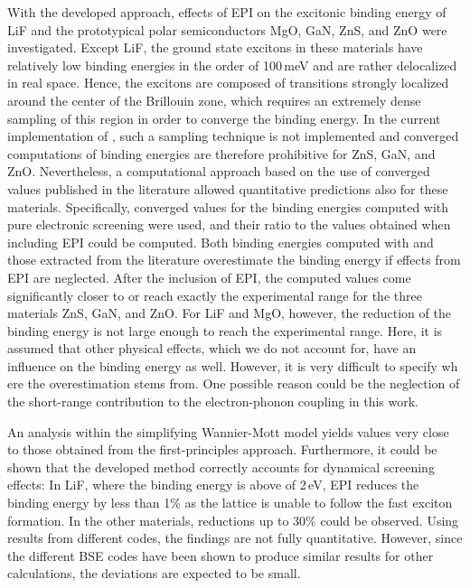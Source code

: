 With the  developed approach, effects of EPI on the excitonic binding energy of LiF and the prototypical polar semiconductors MgO, GaN, ZnS, and ZnO were investigated. Except LiF, the ground state excitons in these materials have relatively low binding energies in the order of 100\,meV and are rather delocalized in real space. Hence, the excitons are composed of transitions  strongly localized around the center of the Brillouin zone, which requires an extremely dense sampling of this region  in order to converge the binding energy. In the current implementation of \exciting{}, such a sampling technique  is not implemented and converged computations of binding energies are therefore prohibitive for ZnS, GaN, and ZnO. Nevertheless, a computational approach based on the use of converged values published in the literature allowed quantitative predictions also for these materials. Specifically, converged values for the binding energies computed with pure electronic screening were used, and their ratio to the values obtained when including EPI could be computed. Both binding energies computed with \exciting{} and those extracted from the literature overestimate the binding energy if effects from EPI are neglected. After the inclusion of EPI, the computed values come significantly closer to or reach exactly the experimental range for the three materials ZnS, GaN, and ZnO. For LiF and MgO, however, the reduction of the binding energy is not large enough to reach the experimental range. Here, it is assumed that other physical effects, which we do not account for, have an influence on the binding energy as well. However, it is very difficult to specify wh ere the overestimation stems from. One possible reason could be the neglection of the short-range contribution to the electron-phonon coupling in this work. \par 
An analysis within the simplifying Wannier-Mott model yields values very close to those obtained from the first-principles approach. Furthermore, it could be shown that the developed method correctly accounts for dynamical screening effects: In LiF, where the binding energy is above of 2\,eV, EPI reduces the binding energy by less than 1\% as the lattice is unable to follow the fast exciton formation. In the other materials, reductions up to 30\% could be observed. Using results from different codes, the findings are not fully quantitative. However, since the different BSE codes have been shown to produce similar results for other calculations, the deviations are expected to be small.\par
